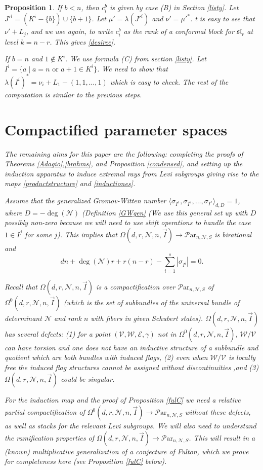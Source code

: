 \documentclass[11pt]{amsart}
\newcommand\me{\mathcal{E}}
\newcommand\mv{\mathcal{V}}
\newcommand\mw{\mathcal{W}}
\newcommand\mn{\mathcal{N}}
\newcommand\Par{\mathcal{P}\text{ar} }
\newtheorem{proposition}[theorem]{Proposition}
\numberwithin{theorem}{subsection}
\begin{document}
{\begin{proposition}
If $b<n$, then $c^b_i$ is given by case (B) in Section \ref{listy}. Let $J'^i=(K^i-\{b\})\cup \{b+1\}$. Let $\mu'=\lambda(J'^i)$ and $\nu'=\mu'^*$. t is easy to see that $\nu'+L_j$, and we use  \cite[Proposition 3.4]{BHorn} again, to write $c^b_i$ as the rank of a conformal block for $\mathfrak{sl}_r$  at level $k=n-r$. This gives \eqref{desiree}.

If $b=n$ and $1\not\in K^i.$ We use formula (C) from section \ref{listy}. Let $I^i= \{a\mid a=n\text{ or } a+1\in K^i\}$. We need to show that $\lambda(I^i)^*=\nu_i +L_1 -(1,1,\dots,1)$ which is easy to check. The rest of the computation is similar to the previous steps.
\section{Compactified parameter spaces}\label{compact}
The remaining aims for this paper are the following: completing the proofs of Theorems \ref{Adagio},\ref{brahms}, and Proposition \ref{condensed}, and  setting up the induction apparatus to induce extremal rays from Levi subgroups giving rise to the maps \eqref{productstructure} and \eqref{inductiones}.

Assume that the generalized Gromov-Witten number $\langle\sigma_{I^1}, \sigma_{I^2},\dots,\sigma_{I^s}\rangle_{d,D}=1$, where $D=-\deg(\mn)$ (Definition  \ref{GWgen} (We use this general set up with $D$ possibly non-zero because we will need to use shift operations to handle the case $1\in I^j$ for some $j$). This implies that $\Omega(d,r,\mn,n,\vec{I})\to \Par_{n,\mn,S}$ is birational and
\begin{equation}\label{timer1}
dn +\deg(\mn)r +r(n-r)-\sum_{i=1}^s |\sigma_{I^i}|=0.
\end{equation}

Recall that  $\Omega(d,r,\mn,n,\vec{I})$ is a compactification over $\Par_{n,\mn,S}$ of $\Omega^0(d,r,\mn,n,\vec{I})$ (which is the set of subbundles of the universal bundle of determinant $\mn$ and rank $n$ with fibers in given Schubert states). $\Omega(d,r,\mn,n,\vec{I})$ has several defects: (1) for a  point $(\mv,\mw,\me,\gamma)$ not in $\Omega^0(d,r,\mn,n,\vec{I})$,  $\mw/\mv$ can have torsion and one does not have an inductive structure of a  subbundle and quotient which are both bundles with induced flags, (2) even when $\mw/\mv$ is locally free the induced flag structures cannot be assigned without discontinuities ,and (3) $\Omega(d,r,\mn,n,\vec{I})$ could be singular.

For the induction map and the proof of Proposition \ref{fulC} we need a relative
partial compactification of $\Omega^0(d,r,\mn,n,\vec{I})\to \Par_{n,\mn,S}$ without these defects, as well as stacks for the relevant Levi subgroups. We will also need to understand the ramification properties of $\Omega(d,r,\mn,n,\vec{I})\to \Par_{n,\mn,S}$.  This will result in a (known) multiplicative generalization of a conjecture of Fulton, which we prove for completeness here (see Proposition \ref{fulC} below).




\end{proposition}}
\end{document}
